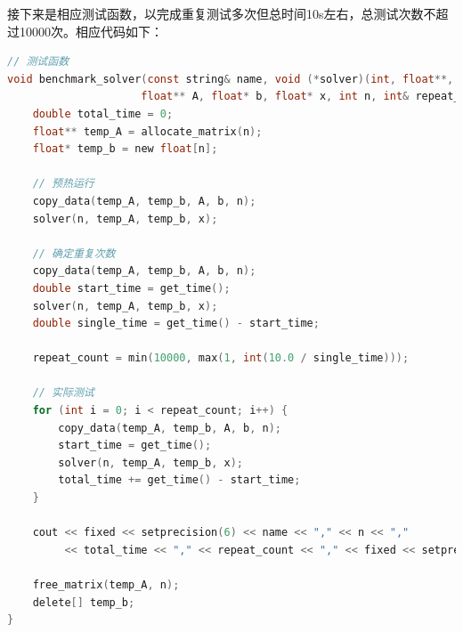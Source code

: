 \documentclass{nku}
\begin{document}
接下来是相应测试函数，以完成重复测试多次但总时间10s左右，总测试次数不超过10000次。相应代码如下：
\begin{lstlisting}[language=C]
// 测试函数
void benchmark_solver(const string& name, void (*solver)(int, float**, float*, float*),
                     float** A, float* b, float* x, int n, int& repeat_count) {
    double total_time = 0;
    float** temp_A = allocate_matrix(n);
    float* temp_b = new float[n];

    // 预热运行
    copy_data(temp_A, temp_b, A, b, n);
    solver(n, temp_A, temp_b, x);

    // 确定重复次数
    copy_data(temp_A, temp_b, A, b, n);
    double start_time = get_time();
    solver(n, temp_A, temp_b, x);
    double single_time = get_time() - start_time;

    repeat_count = min(10000, max(1, int(10.0 / single_time)));

    // 实际测试
    for (int i = 0; i < repeat_count; i++) {
        copy_data(temp_A, temp_b, A, b, n);
        start_time = get_time();
        solver(n, temp_A, temp_b, x);
        total_time += get_time() - start_time;
    }

    cout << fixed << setprecision(6) << name << "," << n << ","
         << total_time << "," << repeat_count << "," << fixed << setprecision(9) << total_time / repeat_count << endl;

    free_matrix(temp_A, n);
    delete[] temp_b;
}
\end{lstlisting}
\end{document}
